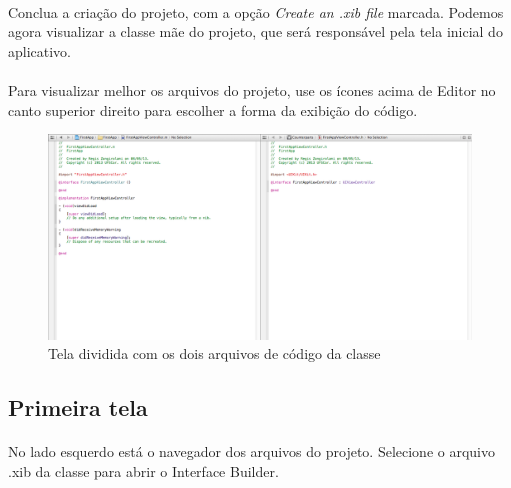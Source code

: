 \documentclass[a4paper,12pt,brazil,doubleside]{book}
\begin{document}
\bigskip

\paragraph{}Conclua a criação do projeto, com a opção \emph{Create an .xib file} marcada. Podemos agora visualizar a classe mãe do projeto, que será responsável pela tela inicial do aplicativo.
\paragraph{}Para visualizar melhor os arquivos do projeto, use os ícones acima de Editor no canto superior direito para escolher a forma da exibição do código.

\begin{figure}[h]
  \centering
  \includegraphics[totalheight=0.3\textheight]{../figuras/ios/1/codigo_classe_mh.png}
  \caption{Tela dividida com os dois arquivos de código da classe}
  \label{fig:a}
\end{figure}

\bigskip

\subsection{Primeira tela}

\paragraph{}No lado esquerdo está o navegador dos arquivos do projeto. Selecione o arquivo .xib da classe para abrir o Interface Builder.
\end{document}
